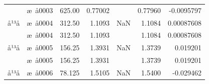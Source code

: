 \documentclass[UTF8,10pt,a4paper,fontset=fandol]{ctexart}
\newcommand{\fieldvalue}[1]{#1}
\begin{document}
\begin{tabularx}{\textwidth}{l l r r r r r}
&
\fieldvalue{æ å0003} &
\fieldvalue{625.00} &
\fieldvalue{0.77002} &
&
\fieldvalue{0.77960} &
\fieldvalue{-0.0095797}\\

å¹³å &
\fieldvalue{æ å0004} &
\fieldvalue{312.50} &
\fieldvalue{1.1093} &
\fieldvalue{NaN} &
\fieldvalue{1.1084} &
\fieldvalue{0.00087608}\\

&
\fieldvalue{æ å0004} &
\fieldvalue{312.50} &
\fieldvalue{1.1093} &
&
\fieldvalue{1.1084} &
\fieldvalue{0.00087608}\\

å¹³å &
\fieldvalue{æ å0005} &
\fieldvalue{156.25} &
\fieldvalue{1.3931} &
\fieldvalue{NaN} &
\fieldvalue{1.3739} &
\fieldvalue{0.019201}\\

&
\fieldvalue{æ å0005} &
\fieldvalue{156.25} &
\fieldvalue{1.3931} &
&
\fieldvalue{1.3739} &
\fieldvalue{0.019201}\\

å¹³å &
\fieldvalue{æ å0006} &
\fieldvalue{78.125} &
\fieldvalue{1.5105} &
\fieldvalue{NaN} &
\fieldvalue{1.5400} &
\fieldvalue{-0.029462}\\


\end{tabularx}
\end{document}
